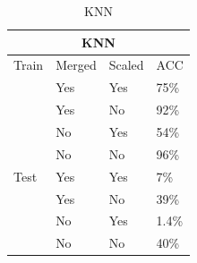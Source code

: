 \documentclass[17pt]{article}
\begin{document}
\begin{table}[]
	\caption{KNN}
	\centering
	\label{KNNTable}
	\begin{tabular}{|l|l|l|l|}
		\hline
		\multicolumn{4}{|c|}{KNN}\\
		\cline{1-4}
		\hline
		Train & Merged & Scaled & ACC \\
		\cline{2-4}
		&    Yes      &   Yes    & 75\%  \\
		\cline{2-4}
		&    Yes      &   No     & 92\% \\
		\cline{2-4}
		& No & Yes & 54\% \\
		\cline{2-4}
		& No & No & 96\%\\
		\hline
		
		Test & Yes & Yes & 7\% \\
		\cline{2-4}
		&    Yes      &   No     & 39\%\\
		\cline{2-4}
		& No & Yes & 1.4\% \\
		\cline{2-4}
		& No & No & 40\%\\
		\hline
	\end{tabular}
\end{table}
\end{document}
